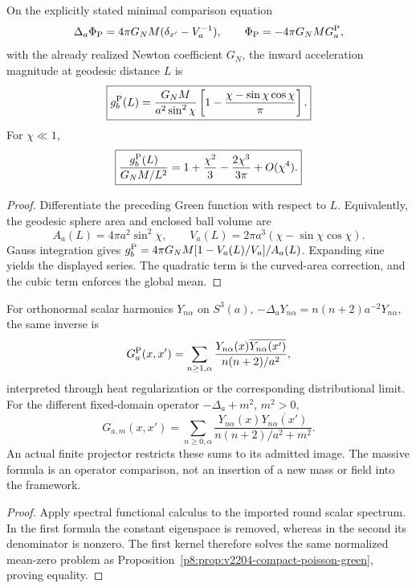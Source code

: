 \documentclass[12pt,a4paper]{article}
\begin{document}
\begin{corollary}
\label{p8:cor:v2204-compact-poisson-force}
On the explicitly stated minimal comparison equation
\[
 \Delta_a\Phi_{\rm P}=4\pi G_NM(\delta_{x'}-V_a^{-1}),\qquad
 \Phi_{\rm P}=-4\pi G_NM G_a^{\rm P},
\]
with the already realized Newton coefficient $G_N$, the inward acceleration
magnitude at geodesic distance $L$ is
\begin{equation}
\label{p8:eq:v2204-compact-poisson-force}
 \boxed{g_b^{\rm P}(L)
 =\frac{G_NM}{a^2\sin^2\chi}
   \left[1-\frac{\chi-\sin\chi\cos\chi}{\pi}\right].}
\end{equation}
For $\chi\ll1$,
\begin{equation}
\label{p8:eq:v2204-compact-poisson-force-series}
 \boxed{\frac{g_b^{\rm P}(L)}{G_NM/L^2}
 =1+\frac{\chi^2}{3}-\frac{2\chi^3}{3\pi}+O(\chi^4).}
\end{equation}
\end{corollary}
\begin{proof}
Differentiate the preceding Green function with respect to $L$. Equivalently,
the geodesic sphere area and enclosed ball volume are
\[
 A_a(L)=4\pi a^2\sin^2\chi,\qquad
 V_a(L)=2\pi a^3(\chi-\sin\chi\cos\chi).
\]
Gauss integration gives $g_b^{\rm P}=4\pi G_NM[1-V_a(L)/V_a]/A_a(L)$.
Expanding sine yields the displayed series. The quadratic term is the
curved-area correction, and the cubic term enforces the global mean.
\end{proof}

\begin{proposition}
\label{p8:prop:v2204-poisson-spectral-reference}
For orthonormal scalar harmonics $Y_{n\alpha}$ on $S^3(a)$,
$-\Delta_aY_{n\alpha}=n(n+2)a^{-2}Y_{n\alpha}$, the same inverse is
\[
 G_a^{\rm P}(x,x')
 =\sum_{n\ge1,\alpha}
 \frac{Y_{n\alpha}(x)\overline{Y_{n\alpha}(x')}}{n(n+2)/a^2},
\]
interpreted through heat regularization or the corresponding distributional
limit. For the different fixed-domain operator $-\Delta_a+m^2$, $m^2>0$,
\[
 G_{a,m}(x,x')
 =\sum_{n\ge0,\alpha}
 \frac{Y_{n\alpha}(x)\overline{Y_{n\alpha}(x')}}{n(n+2)/a^2+m^2}.
\]
An actual finite projector restricts these sums to its admitted image. The
massive formula is an operator comparison, not an insertion of a new mass
or field into the framework.
\end{proposition}
\begin{proof}
Apply spectral functional calculus to the imported round scalar spectrum.
In the first formula the constant eigenspace is removed, whereas in the
second its denominator is nonzero. The first kernel therefore solves the
same normalized mean-zero problem as
Proposition~\ref{p8:prop:v2204-compact-poisson-green}, proving equality.
\end{proof}
\end{document}
